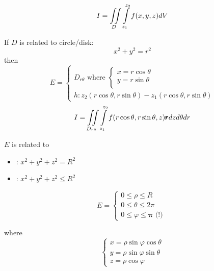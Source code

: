 \begin{multicols}{3}
      \begin{equation}
        I = \iint \limits_{D} \int \limits_{z_{1}}^{z_{2}} f(x, y, z) dV
      \end{equation}

      \par If $D$ is related to circle/disk:
        \begin{equation*}
          x^{2} + y^{2} = r^{2}
        \end{equation*}
        then
        \begin{equation*}
          E =
          \begin{cases}
            D_{r \theta} \mbox{ where } 
            \begin{cases}
              x = r\cos\theta \\
              y = r\sin\theta \\
            \end{cases} \\
            h: z_{2}(r\cos\theta, r\sin\theta) - z_{1}(r\cos\theta, r\sin\theta)
          \end{cases}
        \end{equation*}
      \begin{equation}
        I = \iint \limits_{D_{r \theta}}
          \int \limits_{z_{1}}^{z_{2}} f(r\cos\theta, r\sin\theta, z) \pmb{r} dz d\theta dr
      \end{equation}

\colbreak

      \par $E$ is related to
        \begin{itemize}
          \setlength\itemsep{0em}
          \item {}: $x^{2} + y^{2} + z^{2} = R^{2}$
          \item {}: $x^{2} + y^{2} + z^{2} \leq R^{2}$
        \end{itemize}
        \begin{equation*}
          E =
            \begin{cases}
              0 \leq \rho \leq R \\
              0 \leq \theta \leq 2 \pi \\
              0 \leq \varphi \leq \pmb{\pi} \mbox{ (!) }
            \end{cases}
        \end{equation*}

        where
        \begin{equation*}
          \begin{cases}
            x = \rho \sin \varphi \cos \theta \\
            y = \rho \sin \varphi \sin \theta \\
            z = \rho \cos \varphi
          \end{cases}
        \end{equation*}


\end{multicols}
